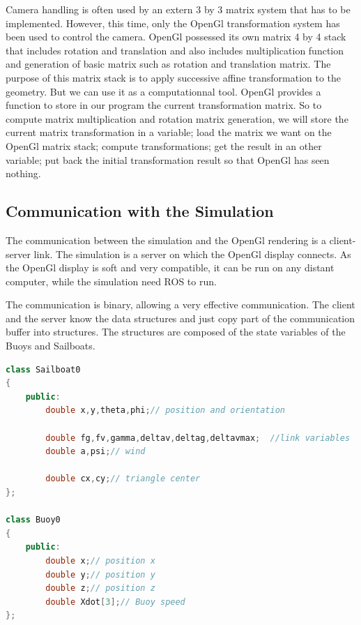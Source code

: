 \documentclass[a4paper]{report}
\begin{document}
Camera handling is often used by an extern 3 by 3 matrix system that has to be implemented. However, this time, only the OpenGl transformation system has been used to control the camera. OpenGl possessed its own matrix 4 by 4 stack that includes rotation and translation and also includes multiplication function and generation of basic matrix such as rotation and translation matrix. The purpose of this matrix stack is to apply successive affine transformation to the geometry. But we can use it as a computationnal tool. OpenGl provides a function to store in our program the current transformation matrix. So to compute matrix multiplication and rotation matrix generation, we will store the current matrix transformation in a variable; load the matrix we want on the OpenGl matrix stack; compute transformations; get the result in an other variable; put back the initial transformation result so that OpenGl has seen nothing.

\subsection{Communication with the Simulation}

The communication between the simulation and the OpenGl rendering is a client-server link. The simulation is a server on which the OpenGl display connects. As the OpenGl display is soft and very compatible, it can be run on any distant computer, while the simulation need ROS to run.

The communication is binary, allowing a very effective communication. The client and the server know the data structures and just copy part of the communication buffer into structures. The structures are composed of the state variables of the Buoys and Sailboats.

\renewcommand{\lstlistingname}{Code}
\begin{lstlisting}[language=C++, caption={display opengl communication structures}, frame=single]
class Sailboat0
{	
    public:	
        double x,y,theta,phi;// position and orientation
	
        double fg,fv,gamma,deltav,deltag,deltavmax;  //link variables
        double a,psi;// wind            
            
        double cx,cy;// triangle center
};

class Buoy0
{
    public:
        double x;// position x
        double y;// position y
        double z;// position z
        double Xdot[3];// Buoy speed
};
\end{lstlisting}
\end{document}
